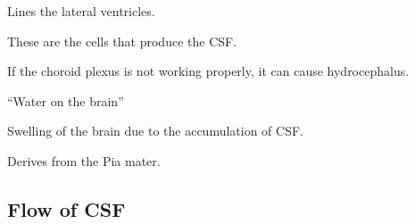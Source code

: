 \begin{coloredlist}
    \item {}
    \begin{coloredlist}
        \item {}
        \begin{coloredlist}
            \item Lines the lateral ventricles.
            \item These are the cells that produce the CSF.
        \end{coloredlist}
        \item If the choroid plexus is not working properly, it can cause hydrocephalus.
        \item {}
        \begin{coloredlist}
            \item ``Water on the brain''
            \item Swelling of the brain due to the accumulation of CSF.
        \end{coloredlist}
        \item Derives from the Pia mater.


    \end{coloredlist}
\end{coloredlist}

\subsection{Flow of CSF}


